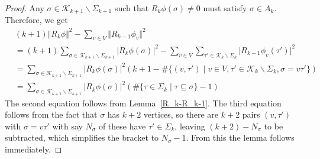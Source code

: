 \documentclass[10pt]{amsart}
\theoremstyle{definition}
\newcommand{\K}{\mathcal{K}}
\begin{document}
\begin{proof}
    Any $\sigma\in \K_{k+1}\backslash\Sigma_{k+1}$ such that $R_k\phi(\sigma)\neq 0$ must satisfy $\sigma\in A_k.$ Therefore, we get
    \begin{align*}
        &(k+1)\Vert R_k\phi\Vert^2-\sum_{v\in V}\Vert R_{k-1}\phi_v\Vert^2\\
        & = (k+1)\sum_{\sigma\in \K_{k+1}\backslash\Sigma_{k+1} } \vert R_k\phi(\sigma)\vert^2-\sum_{v\in V}\sum_{\tau'\in \K_k\backslash\Sigma_k}\vert R_{k-1}\phi_v(\tau')\vert^2\\
        &= \sum_{\sigma\in \K_{k+1}\backslash\Sigma_{k+1}} \vert R_k\phi(\sigma)\vert^2\left(k+1-\#\lbrace (v,\tau')\mid v\in V,\tau'\in \K_k\backslash\Sigma_k, \sigma = v\tau'\rbrace\right)\\
        &= \sum_{\sigma\in \K_{k+1}\backslash\Sigma_{k+1}} \vert R_k\phi(\sigma)\vert^2\left(\#\lbrace\tau\in\Sigma_k\mid\tau\subseteq\sigma\rbrace-1\right)
    \end{align*}
    The second equation follows from Lemma~\ref{R_k-R_k-1}.
    The third equation follows from the fact that  $\sigma$ has $k+2$ vertices, so there are $k+2$ pairs $(v,\tau')$ with $\sigma=v\tau'$ with say $N_\sigma$ of these have $\tau'\in\Sigma_k$, leaving $(k+2)-N_\sigma$ to be subtracted, which simplifies the bracket to $N_\sigma-1$. 
    From this the lemma follows immediately.
\end{proof}
\end{document}
